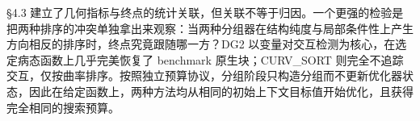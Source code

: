 §4.3 建立了几何指标与终点的统计关联，但关联不等于归因。一个更强的检验是把两种排序的冲突单独拿出来观察：当两种分组器在结构纯度与局部条件性上产生方向相反的排序时，终点究竟跟随哪一方？DG2 以变量对交互检测为核心，在选定病态函数上几乎完美恢复了 benchmark 原生块；CURV\_SORT 则完全不追踪交互，仅按曲率排序。按照独立预算协议，分组阶段只构造分组而不更新优化器状态，因此在给定函数上，两种方法均从相同的初始上下文目标值开始优化，且获得完全相同的搜索预算。
